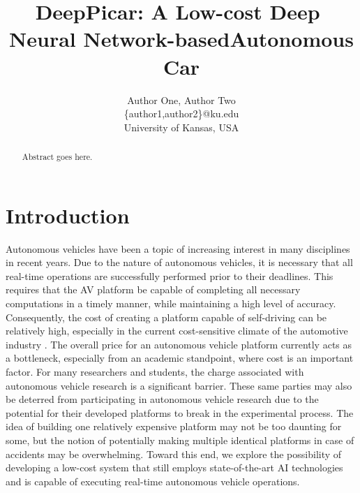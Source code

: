 \documentclass[10pt, conference]{IEEEtran}
\begin{document}
\title{DeepPicar:​ ​A​ ​Low-cost​ ​Deep​ ​Neural​ ​Network-based​ ​Autonomous​ ​Car}
\author{Author One, Author Two\\
\{author1,author2\}@ku.edu\\
University of Kansas, USA\\ 
}

\maketitle
\thispagestyle{empty}
\begin{abstract}

Abstract goes here.

\end{abstract}



\section{Introduction}
Autonomous vehicles have been a topic of increasing interest in many
disciplines in recent years. Due to the nature of autonomous vehicles,
it is necessary that all real-time operations are successfully
performed prior to their deadlines. This requires that the AV platform
be capable of completing all necessary computations in a timely
manner, while maintaining a high level of accuracy. Consequently, the
cost of creating a platform capable of self-driving can be relatively
high, especially in the current cost-sensitive climate of the
automotive industry \cite{}. The overall price for an autonomous
vehicle platform currently acts as a bottleneck, especially from an
academic standpoint, where cost is an important factor. For many
researchers and students, the charge associated with autonomous
vehicle research is a significant barrier. These same parties may also
be deterred from participating in autonomous vehicle research due to
the potential for their developed platforms to break in the
experimental process. The idea of building one relatively expensive
platform may not be too daunting for some, but the notion of
potentially making multiple identical platforms in case of accidents
may be overwhelming. Toward this end, we explore the possibility of
developing a low-cost system that still employs state-of-the-art AI
technologies and is capable of executing real-time autonomous vehicle
operations. 
	
\end{document}
